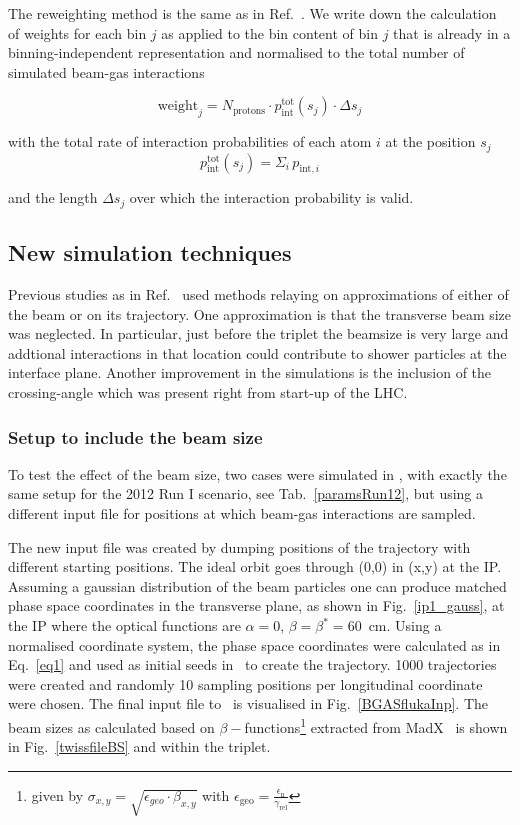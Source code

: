 The reweighting method is the same as in Ref.~\cite{nimPaperRod}. We write down the calculation of weights for each bin $j$ as applied to the bin content of bin $j$ that is already in a binning-independent representation and normalised to the total number of simulated beam-gas interactions 

\begin{equation} \label{eq3}
\mathrm{weight}_j = N_{\mathrm{protons}} \cdot p_{\mathrm{int}}^{\mathrm{tot}} (s_j) \cdot \Delta s_{j} 
\end{equation}

with the total rate of interaction probabilities of each atom $i$ at the position $s_j$ 
\begin{equation*} 
  p_{\mathrm{int}}^{\mathrm{tot}} (s_j) = \Sigma_i \, p_{\textrm{int},i}
\end{equation*}

and the length $\Delta s_{j}$ over which the interaction probability is valid.

\subsection{New simulation techniques}
Previous studies as in Ref.~\cite{nimPaperRod} used methods relaying on approximations of either of the beam or on its trajectory. One approximation is that the transverse beam size was neglected. In particular, just before the triplet the beamsize is very large and addtional interactions in that location could contribute to shower particles at the interface plane. Another improvement in the simulations is the inclusion of the crossing-angle which was present right from start-up of the LHC.

\subsubsection{Setup to include the beam size}
To test the effect of the beam size, two cases were simulated in \fluka, with exactly the same setup for the 2012 Run I scenario, see Tab.~\ref{paramsRun12}, but using a different input file for positions at which beam-gas interactions are sampled.

The new input file was created by dumping positions of the trajectory with different starting positions. The ideal orbit goes through (0,0) in (x,y) at the IP. Assuming a gaussian distribution of the beam particles one can produce matched phase space coordinates in the transverse plane, as shown in Fig.~\ref{ip1_gauss}, at the IP where the optical functions are $\alpha = 0$, $\beta = \beta^* = 60$~cm. Using a normalised coordinate system, the phase space coordinates were calculated as in Eq.~\ref{eq1} and used as initial seeds in \fluka~to create the trajectory. 1000 trajectories were created and randomly 10 sampling positions per longitudinal coordinate were chosen. The final input file to \fluka~is visualised in Fig.~\ref{BGASflukaInp}. The beam sizes as calculated based on $\beta-$functions\footnote{given by $\sigma_{x,y} = \sqrt{\epsilon_{geo} \cdot \beta_{x,y}}$ with $\epsilon_{\textrm{geo}} = \frac{ \epsilon_{\textrm{n}}}{\gamma_{\textrm{rel}}}$} extracted from MadX~\cite{refMadX} is shown in Fig.~\ref{twissfileBS} and within the triplet.


